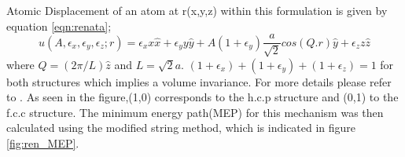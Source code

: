 \documentclass[preprint]{elsarticle}
\begin{document}
Atomic Displacement of an atom at r(x,y,z) within this formulation is given by equation \ref{eqn:renata};
\begin{equation}
 u(A,\epsilon_x, \epsilon_y, \epsilon_z;r)=\epsilon_x x \hat{x}+\epsilon_y y \hat{y}+ A(1+\epsilon_y)\frac{a}{\sqrt{2}}cos(Q.r)\hat{y}+\epsilon_z z \hat{z} 
\label{eqn:renata}
\end{equation}
where $Q=(2\pi/L)\hat{z}$ and $L=\sqrt{2} a$. $(1+\epsilon_{x})+(1+\epsilon_{y})+(1+\epsilon_{z})=1$ for both structures which implies a volume invariance. For more details please refer to 
\cite{wentzcovitch1991fcc}.
As seen in the figure,(1,0) corresponds  to the h.c.p structure and (0,1) to the f.c.c structure.
The minimum energy path(MEP) for this mechanism was then calculated using the modified string method\cite{samanta2010modified}, which is indicated in figure \ref{fig:ren_MEP}.
\end{document}
